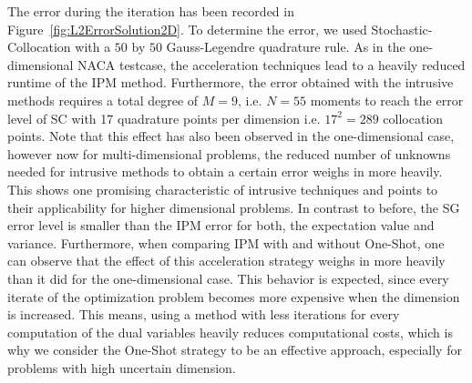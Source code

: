 The error during the iteration has been recorded in Figure~\ref{fig:L2ErrorSolution2D}. To determine the error, we used Stochastic-Collocation with a $50$ by $50$ Gauss-Legendre quadrature rule. As in the one-dimensional NACA testcase, the acceleration techniques lead to a heavily reduced runtime of the IPM method. Furthermore, the error obtained with the intrusive methods requires a total degree of $M = 9$, i.e. $N = 55$ moments to reach the error level of SC with 17 quadrature points per dimension i.e. $17^2 = 289$ collocation points. Note that this effect has also been observed in the one-dimensional case, however now for multi-dimensional problems, the reduced number of unknowns needed for intrusive methods to obtain a certain error weighs in more heavily. This shows one promising characteristic of intrusive techniques and points to their applicability for higher dimensional problems. In contrast to before, the SG error level is smaller than the IPM error for both, the expectation value and variance. Furthermore, when comparing IPM with and without One-Shot, one can observe that the effect of this acceleration strategy weighs in more heavily than it did for the one-dimensional case. This behavior is expected, since every iterate of the optimization problem becomes more expensive when the dimension is increased. This means, using a method with less iterations for every computation of the dual variables heavily reduces computational costs, which is why we consider the One-Shot strategy to be an effective approach, especially for problems with high uncertain dimension.
